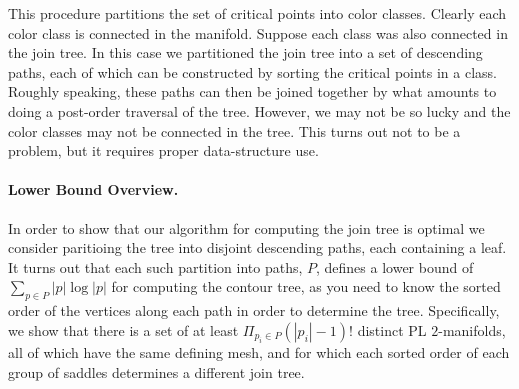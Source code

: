 \documentclass[11pt]{article}
\theoremstyle{definition}
\begin{document}
\begin{compactitem}
 This procedure partitions the set of critical points into color classes.  Clearly each color 
 class is connected in the manifold.  Suppose each class was also connected in the join tree.  
 In this case we partitioned the join tree into a set of descending paths, each of which 
 can be constructed by sorting the critical points in a class.  Roughly speaking, 
 these paths can then be joined together by what amounts to doing a post-order traversal of the tree.
 However, we may not be so lucky and the color classes may not be connected in the 
 tree.  This turns out not to be a problem, but it requires proper data-structure use. 
%  
\end{compactitem}

\paragraph{Lower Bound Overview.}
In order to show that our algorithm for computing the join tree is optimal we consider paritioing the tree into disjoint 
descending paths, each containing a leaf.  It turns out that each such partition into paths, $P$, 
defines a lower bound of $\sum_{p\in P} |p|\log|p|$ for computing the contour tree, as you need to know the 
sorted order of the vertices along each path in order to determine the tree.
Specifically, we show that there is a set of at least $\Pi_{p_i\in P} (|p_i|-1)!$ distinct PL $2$-manifolds, 
all of which have the same defining mesh, and for which each sorted order of each group of saddles determines a different join tree.
\end{document}
